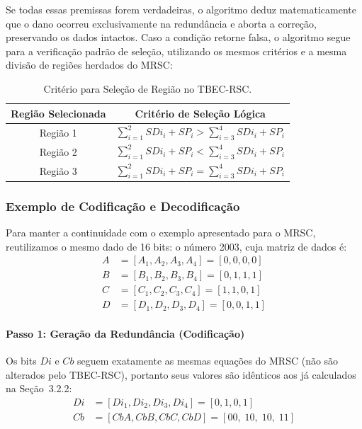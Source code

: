 \documentclass[12pt,a4paper]{article}
\begin{document}
Se todas essas premissas forem verdadeiras, o algoritmo deduz matematicamente que o dano ocorreu exclusivamente na redundância e aborta a correção, preservando os dados intactos. Caso a condição retorne falsa, o algoritmo segue para a verificação padrão de seleção, utilizando os mesmos critérios e a mesma divisão de regiões herdados do MRSC:
\begin{table}[htpb]
\centering
\caption{Critério para Seleção de Região no TBEC-RSC.}
\label{tab:criterio_regiao_tbec}
\vspace{0.1cm}
\begin{tabular}{cc}
\toprule
\textbf{Região Selecionada} & \textbf{Critério de Seleção Lógica} \\
\midrule
Região 1 & $\sum_{i=1}^{2} SDi_i + SP_i > \sum_{i=3}^{4} SDi_i + SP_i$ \\
Região 2 & $\sum_{i=1}^{2} SDi_i + SP_i < \sum_{i=3}^{4} SDi_i + SP_i$ \\
Região 3 & $\sum_{i=1}^{2} SDi_i + SP_i = \sum_{i=3}^{4} SDi_i + SP_i$ \\
\bottomrule
\end{tabular}
\end{table}

\subsubsection{Exemplo de Codificação e Decodificação}

Para manter a continuidade com o exemplo apresentado para o MRSC, reutilizamos 
o mesmo dado de 16 bits: o número 2003, cuja matriz de dados é:
\begin{align*}
    A &= [A_1, A_2, A_3, A_4] = [0, 0, 0, 0] \\
    B &= [B_1, B_2, B_3, B_4] = [0, 1, 1, 1] \\
    C &= [C_1, C_2, C_3, C_4] = [1, 1, 0, 1] \\
    D &= [D_1, D_2, D_3, D_4] = [0, 0, 1, 1]
\end{align*}

\paragraph{Passo 1: Geração da Redundância (Codificação)}

Os bits $Di$ e $Cb$ seguem exatamente as mesmas equações do MRSC (não são 
alterados pelo TBEC-RSC), portanto seus valores são idênticos aos já 
calculados na Seção~3.2.2:
\begin{align*}
    Di &= [Di_1, Di_2, Di_3, Di_4] = [0, 1, 0, 1] \\
    Cb &= [CbA, CbB, CbC, CbD] = [00,\; 10,\; 10,\; 11]
\end{align*}
\end{document}
